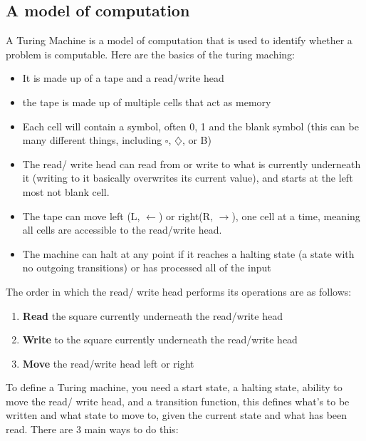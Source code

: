 \subsection{A model of computation}
  \noindent
  A Turing Machine is a model of computation that is used to identify whether a problem is computable. 
  Here are the basics of the turing maching:
  \begin{itemize}
  	\item It is made up of a tape and a read/write head
  	\item the tape is made up of multiple cells that act as memory
  	\item Each cell will contain a symbol, often 0, 1 and the blank symbol (this can be many different things, including $\square$, $\diamondsuit$, or B)
  	\item The read/ write head can read from or write to what is currently underneath it (writing to it basically overwrites its current value), and starts at the left most not blank cell.
  	\item The tape can move left (L, $\leftarrow$) or right(R, $\rightarrow$), one cell at a time, meaning all cells are accessible to the read/write head.
  	\item The machine can halt at any point if it reaches a halting state (a state with no outgoing transitions) or has processed all of the input
  \end{itemize}
  The order in which the read/ write head performs its operations are as follows:
  \begin{enumerate}
  	\item \textbf{Read} the square currently underneath the read/write head
  	\item \textbf{Write} to the square currently underneath the read/write head
  	\item \textbf{Move} the read/write head left or right
  \end{enumerate} 
  To define a Turing machine, you need a start state, a halting state, ability to move the read/ write head, and a transition function, this defines what's to be written and what state to move to, given the current state and what has been read. There are 3 main ways to do this:
